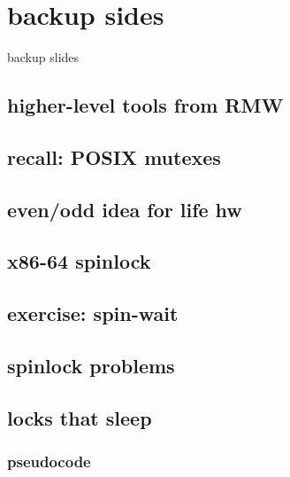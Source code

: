 

\section{backup sides}
\begin{frame}{}
\end{frame}

\begin{frame}{backup slides}
\end{frame}

\subsection{higher-level tools from RMW}


\subsection{recall: POSIX mutexes}


\subsection{even/odd idea for life hw}


\subsection{x86-64 spinlock}


\subsection{exercise: spin-wait}


\subsection{spinlock problems}


\subsection{locks that sleep}



\subsubsection{pseudocode}


